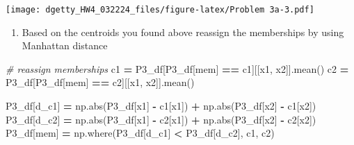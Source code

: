 \documentclass[
]{article}
\newenvironment{Shaded}{\begin{snugshade}}{\end{snugshade}}
\newcommand{\BuiltInTok}[1]{#1}
\newcommand{\CommentTok}[1]{\textcolor[rgb]{0.56,0.35,0.01}{\textit{#1}}}
\newcommand{\NormalTok}[1]{#1}
\newcommand{\OperatorTok}[1]{\textcolor[rgb]{0.81,0.36,0.00}{\textbf{#1}}}
\newcommand{\StringTok}[1]{\textcolor[rgb]{0.31,0.60,0.02}{#1}}
\providecommand{\tightlist}{%
  \setlength{\itemsep}{0pt}\setlength{\parskip}{0pt}}
\begin{document}
\texttt{[image: dgetty\_HW4\_032224\_files/figure-latex/Problem 3a-3.pdf]}

\begin{enumerate}
\def\labelenumi{(\alph{enumi})}
\setcounter{enumi}{1}
\tightlist
\item
  Based on the centroids you found above reassign the memberships by
  using Manhattan distance
\end{enumerate}

\begin{Shaded}
\begin{Highlighting}[]
\CommentTok{\# reassign memberships}
\NormalTok{c1 }\OperatorTok{=}\NormalTok{ P3\_df[P3\_df[}\StringTok{\textquotesingle{}mem\textquotesingle{}}\NormalTok{] }\OperatorTok{==} \StringTok{\textquotesingle{}c1\textquotesingle{}}\NormalTok{][[}\StringTok{\textquotesingle{}x1\textquotesingle{}}\NormalTok{, }\StringTok{\textquotesingle{}x2\textquotesingle{}}\NormalTok{]].mean()}
\NormalTok{c2 }\OperatorTok{=}\NormalTok{ P3\_df[P3\_df[}\StringTok{\textquotesingle{}mem\textquotesingle{}}\NormalTok{] }\OperatorTok{==} \StringTok{\textquotesingle{}c2\textquotesingle{}}\NormalTok{][[}\StringTok{\textquotesingle{}x1\textquotesingle{}}\NormalTok{, }\StringTok{\textquotesingle{}x2\textquotesingle{}}\NormalTok{]].mean()}

\NormalTok{P3\_df[}\StringTok{\textquotesingle{}d\_c1\textquotesingle{}}\NormalTok{] }\OperatorTok{=}\NormalTok{ np.}\BuiltInTok{abs}\NormalTok{(P3\_df[}\StringTok{\textquotesingle{}x1\textquotesingle{}}\NormalTok{] }\OperatorTok{{-}}\NormalTok{ c1[}\StringTok{\textquotesingle{}x1\textquotesingle{}}\NormalTok{]) }\OperatorTok{+}\NormalTok{ np.}\BuiltInTok{abs}\NormalTok{(P3\_df[}\StringTok{\textquotesingle{}x2\textquotesingle{}}\NormalTok{] }\OperatorTok{{-}}\NormalTok{ c1[}\StringTok{\textquotesingle{}x2\textquotesingle{}}\NormalTok{])}
\NormalTok{P3\_df[}\StringTok{\textquotesingle{}d\_c2\textquotesingle{}}\NormalTok{] }\OperatorTok{=}\NormalTok{ np.}\BuiltInTok{abs}\NormalTok{(P3\_df[}\StringTok{\textquotesingle{}x1\textquotesingle{}}\NormalTok{] }\OperatorTok{{-}}\NormalTok{ c2[}\StringTok{\textquotesingle{}x1\textquotesingle{}}\NormalTok{]) }\OperatorTok{+}\NormalTok{ np.}\BuiltInTok{abs}\NormalTok{(P3\_df[}\StringTok{\textquotesingle{}x2\textquotesingle{}}\NormalTok{] }\OperatorTok{{-}}\NormalTok{ c2[}\StringTok{\textquotesingle{}x2\textquotesingle{}}\NormalTok{])}
\NormalTok{P3\_df[}\StringTok{\textquotesingle{}mem\textquotesingle{}}\NormalTok{] }\OperatorTok{=}\NormalTok{ np.where(P3\_df[}\StringTok{\textquotesingle{}d\_c1\textquotesingle{}}\NormalTok{] }\OperatorTok{\textless{}}\NormalTok{ P3\_df[}\StringTok{\textquotesingle{}d\_c2\textquotesingle{}}\NormalTok{], }\StringTok{\textquotesingle{}c1\textquotesingle{}}\NormalTok{, }\StringTok{\textquotesingle{}c2\textquotesingle{}}\NormalTok{)}


\end{Highlighting}
\end{Shaded}
\end{document}
